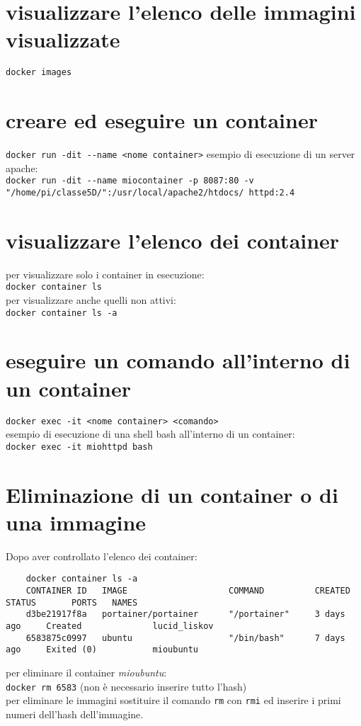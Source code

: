 \documentclass[10pt,a4paper]{report}
\begin{document}
	\section{visualizzare l'elenco delle immagini visualizzate}
    \verb|docker images|
	\section{creare ed eseguire un container}
	\verb|docker run -dit --name <nome container>|
	esempio di esecuzione di un server apache:\\
	\verb|docker run -dit --name miocontainer -p 8087:80 -v "/home/pi/classe5D/":/usr/local/apache2/htdocs/ httpd:2.4| 
	\section{visualizzare l'elenco dei container}
	per visualizzare solo i container in esecuzione:\\
	\verb|docker container ls|\\
	per visualizzare anche quelli non attivi:\\
	\verb|docker container ls -a|
	\section{eseguire un comando all'interno di un container}
	\verb|docker exec -it <nome container> <comando>|\\esempio di esecuzione di una shell bash all'interno di un container:\\
	\verb|docker exec -it miohttpd bash | 
	\section{Eliminazione di un container o di una immagine}
	Dopo aver controllato l'elenco dei container:
	\begin{verbatim}
	docker container ls -a
	CONTAINER ID   IMAGE                    COMMAND          CREATED        STATUS       PORTS   NAMES
	d3be21917f8a   portainer/portainer      "/portainer"     3 days ago     Created              lucid_liskov
	6583875c0997   ubuntu                   "/bin/bash"      7 days ago     Exited (0)           mioubuntu
	\end{verbatim}
	per eliminare il container \textit{mioubuntu}:\\
	\verb|docker rm 6583| (non è necessario inserire tutto l'hash)\\
	per eliminare le immagini sostituire il comando \verb|rm| con \verb|rmi| ed inserire i primi numeri dell'hash dell'immagine.
	
\end{document}
